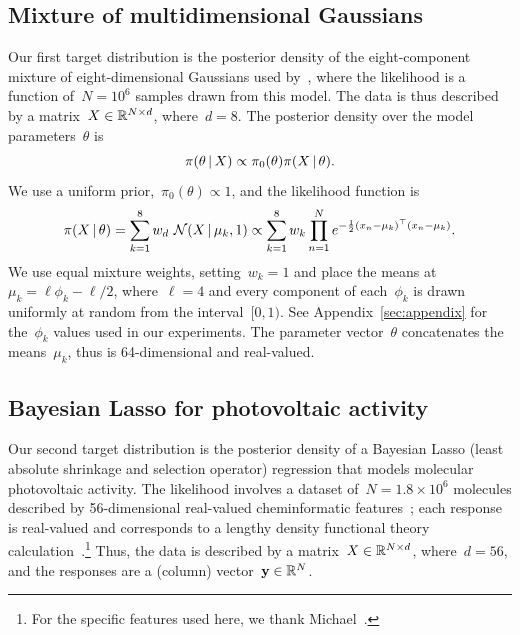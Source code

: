 \documentclass[angelino.tex]{subfiles}
\begin{document}
\subsection{Mixture of multidimensional Gaussians}
\label{sec:mixture}

Our first target distribution is the posterior density of the eight-component
mixture of eight-dimensional Gaussians used by~\citet{nishihara-2014-gess},
where the likelihood is a function of~${N = 10^6}$ samples drawn from this model.
The data is thus described by a matrix~${X \in \mathbb{R}^{N \times d}}$, where~${d = 8}$.
The posterior density over the model parameters~$\theta$ is
\[
\pi(\theta \,|\, X) \propto \pi_0(\theta) \pi(X \,|\, \theta).
\]
We use a uniform prior,~${\pi_0(\theta) \propto 1}$, and the likelihood function is
\[
\pi(X \,|\, \theta) = \sum_{k=1}^8 w_d~{\mathcal N}(X \,|\, \mu_k, 1)
\propto \sum_{k=1}^8 w_k \prod_{n=1}^N e^{-\frac{1}{2}(x_n - \mu_k)^\top (x_n - \mu_k)}.
\]
We use equal mixture weights, setting~${w_k = 1}$ and place the means
at~${\mu_k = \ell \phi_k - \ell / 2}$, where~${\ell = 4}$ and every component of
each~$\phi_k$ is drawn uniformly at random from the interval~${[0, 1)}$.
See Appendix~\ref{sec:appendix} for the~$\phi_k$ values used in our experiments.
The parameter vector~$\theta$ concatenates the means~$\mu_k$,
thus is 64-dimensional and real-valued.


\subsection{Bayesian Lasso for photovoltaic activity}
\label{sec:blasso}

Our second target distribution is the posterior density of a Bayesian Lasso 
(least absolute shrinkage and selection operator)
regression that models molecular photovoltaic activity.
The likelihood involves a dataset of~${N = 1.8 \times 10^6}$ molecules
described by 56-dimensional real-valued cheminformatic
features~\citep{cep-2011-olivares,cep-2013-amador};
each response is real-valued and corresponds to a lengthy density functional
theory calculation~\citep{cep-2011-hachmann,cep-2014-hachmann}.\footnote{For the specific features used here, we thank Michael~\citet{tingley-2014-thesis}.}
Thus, the data is described by a matrix~${X \in \mathbb{R}^{N \times d}}$,
where~${d = 56}$, and the responses are a (column) vector~${\mathbf{y} \in \mathbb{R}^N}$.
\end{document}
